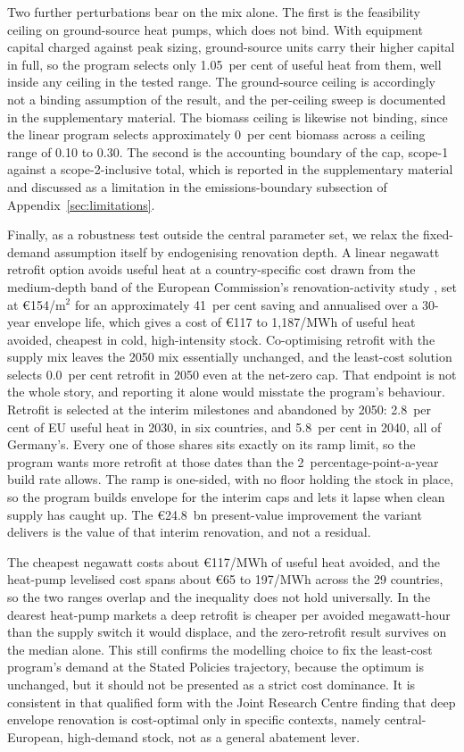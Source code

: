 Two further perturbations bear on the mix alone. The first is the
feasibility ceiling on ground-source heat pumps, which does not bind. With
equipment capital charged against peak sizing, ground-source
units carry their higher capital in full, so the program selects only
1.05~per cent of useful heat from them, well inside any ceiling in the tested range.
The ground-source ceiling is accordingly not a binding assumption of the
result, and the per-ceiling sweep is documented in the supplementary material. The
biomass ceiling is likewise not binding, since the linear program selects
approximately 0~per cent biomass across a ceiling range of 0.10 to 0.30. The
second is the accounting boundary of the cap, scope-1 against a scope-2-inclusive
total, which is reported in the supplementary material and discussed as a limitation in
the emissions-boundary subsection of Appendix~\ref{sec:limitations}.

Finally, as a robustness test outside the central parameter set, we relax the
fixed-demand assumption itself by endogenising renovation depth. A linear negawatt
retrofit option avoids useful heat at a country-specific cost drawn from the medium-depth band of the European Commission's renovation-activity study \citep{Esser2019renovation}, set at \euro{}154/m$^2$ for an approximately 41~per cent saving and annualised over a 30-year envelope life, which gives a cost of \euro{}117 to
1{,}187/MWh of useful heat avoided, cheapest in cold, high-intensity stock.
Co-optimising retrofit with the supply mix leaves the 2050 mix essentially unchanged, and the least-cost solution selects 0.0~per cent retrofit in 2050 even at the net-zero cap. That endpoint is not the whole story, and reporting it alone would misstate the program's behaviour. Retrofit is selected at the interim milestones and abandoned by 2050: 2.8~per cent of EU useful heat in 2030, in six countries, and 5.8~per cent in 2040, all of Germany's. Every one of those shares sits exactly on its ramp limit, so the program wants more retrofit at those dates than the 2~percentage-point-a-year build rate allows. The ramp is one-sided, with no floor holding the stock in place, so the program builds envelope for the interim caps and lets it lapse when clean supply has caught up. The \euro{}24.8~bn present-value improvement the variant delivers is the value of that interim renovation, and not a residual.

The cheapest negawatt costs about \euro{}117/MWh of useful heat avoided, and the
heat-pump levelised cost spans about \euro{}65 to 197/MWh across the 29 countries,
so the two ranges overlap and the inequality does not hold universally. In the dearest
heat-pump markets a deep retrofit is cheaper per avoided megawatt-hour than the supply
switch it would displace, and the zero-retrofit result survives on the median alone. This still confirms the modelling choice to fix the least-cost program's
demand at the Stated Policies trajectory, because the optimum is unchanged, but it
should not be presented as a strict cost dominance. It is consistent in that
qualified form with the Joint Research Centre finding \citep{Filippidou2019} that deep
envelope renovation is cost-optimal only in specific contexts, namely central-European,
high-demand stock, not as a general abatement lever.

